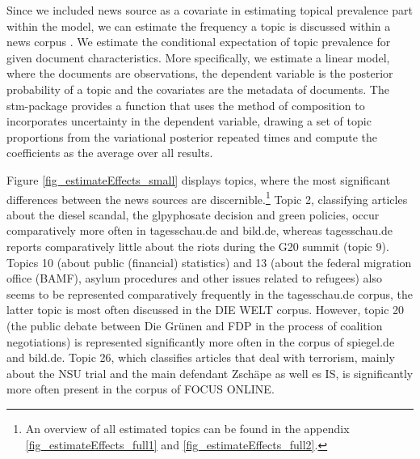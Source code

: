 \documentclass[12pt,a4paper,notitlepage]{article}
\begin{document}
Since we included news source as a covariate in estimating topical prevalence part within the model, we can estimate the frequency a topic is discussed within a news corpus \citep{roberts_model_2016}. We estimate the conditional expectation of topic prevalence for given document characteristics. More specifically, we estimate a linear model, where the documents are observations, the dependent variable is the posterior probability of a topic and the covariates are the metadata of documents. The stm-package provides a function that uses the method of composition to incorporates uncertainty in the dependent variable, drawing a set of topic proportions from the variational posterior repeated times and compute the coefficients as the average over all results. 

Figure \ref{fig_estimateEffects_small} displays topics, where the most significant differences between the news sources are discernible.\footnote{An overview of all estimated topics can be found in the appendix \ref{fig_estimateEffects_full1} and \ref{fig_estimateEffects_full2}.} Topic 2, classifying articles about the diesel scandal, the glpyphosate decision and green policies, occur comparatively more often in tagesschau.de and bild.de, whereas tagesschau.de reports comparatively little about the riots during the G20 summit (topic 9). Topics 10 (about public (financial) statistics) and 13 (about the federal migration office (BAMF), asylum procedures and other issues related to refugees) also seems to be represented comparatively frequently in the tagesschau.de corpus, the latter topic is most often discussed in the DIE WELT corpus. However, topic 20 (the public debate between Die Grünen and FDP in the process of coalition negotiations) is represented significantly more often in the corpus of spiegel.de and bild.de. Topic 26, which classifies articles that deal with terrorism, mainly about the NSU trial and the main defendant Zschäpe as well es IS, is significantly more often present in the corpus of FOCUS ONLINE.
\end{document}
